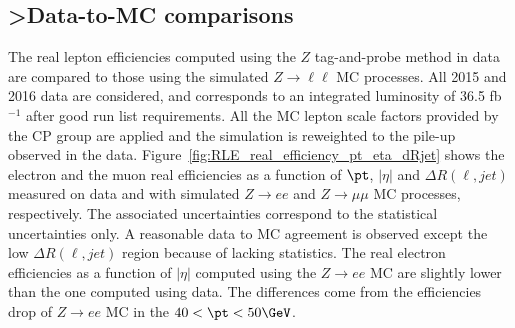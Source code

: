 


\subsection{>Data-to-MC comparisons}
\label{subsubsec:RLE_data_to_mc_comparisons}

The real lepton efficiencies computed using the $Z$ tag-and-probe method in data are compared to those using the simulated $Z\to \ell\ell$ MC processes.
All 2015 and 2016 data are considered, and corresponds to an integrated luminosity of 36.5 fb$^{-1}$ after good run list requirements.
All the MC lepton scale factors provided by the CP group are applied and the simulation is reweighted to the pile-up observed in the data.
Figure~\ref{fig:RLE_real_efficiency_pt_eta_dRjet} shows the electron and the muon real efficiencies as a function of $\pt$, $|\eta|$ and $\Delta R(\ell, jet)$ measured on data and with simulated $Z\to ee$ and $Z\to \mu\mu$ MC processes, respectively.
The associated uncertainties correspond to the statistical uncertainties only.
A reasonable data to MC agreement is observed except the low $\Delta R(\ell, jet)$ region because of lacking statistics.
The real electron efficiencies as a function of $|\eta|$ computed using the $Z\to ee$ MC are slightly lower than the one computed using data.
The differences come from the efficiencies drop of $Z\to ee$ MC in the $40<\pt<50 \GeV$. 

